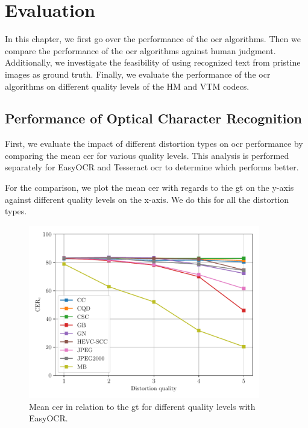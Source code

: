 \chapter{Evaluation}
\label{chap:evaluation}

In this chapter, we first go over the performance of the \gls{ocr} algorithms.
Then we compare the performance of the \gls{ocr} algorithms against human judgment.
Additionally, we investigate the feasibility of using recognized text from pristine images as ground truth.
Finally, we evaluate the performance of the \gls{ocr} algorithms on different quality levels of the HM and VTM codecs.

\section{Performance of Optical Character Recognition}
\label{sec:ocr_performance}

First, we evaluate the impact of different distortion types on \gls{ocr} performance by comparing the mean \gls{cer} for various quality levels.
This analysis is performed separately for EasyOCR and Tesseract \gls{ocr} to determine which performs better.

For the comparison, we plot the mean \gls{cer} with regards to the \gls{gt} on the y-axis against different quality levels on the x-axis.
We do this for all the distortion types.

\begin{figure}[h]
\centering
    \includegraphics[width=0.9\textwidth]{../../images/analyze/cer_dist_quality_gt_ezocr.pdf}
    \caption{Mean \gls{cer} in relation to the \gls{gt} for different quality levels with EasyOCR.}
\label{fig:cer_dist_quality_gt_ezocr}
\end{figure}


